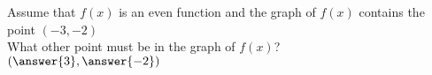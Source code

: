 \documentclass{ximera}
\author{David Kish}
\begin{document}
\begin{exercise}
Assume that $f(x)$ is an even function and the graph of $f(x)$ contains the point $(-3,-2)$\\
What other point must be in the graph of $f(x)$?\\
$(\answer{3},\answer{-2})$
\end{exercise}
\end{document}
